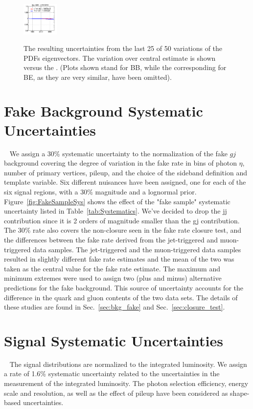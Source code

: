 \begin{figure}[!htbp]
{{\includegraphics[width=0.16\textwidth]{fig/spectra__pdf50_BB18_ADDGRW.png}\\}
\caption{The resulting uncertainties from the last 25 of 50 variations of the PDFs eigenvectors. 
The variation over central estimate is shown versus the \mgg. 
(Plots shown stand for BB, while the corresponding for BE, as they are very similar, have been omitted).
} 
\label{Fig:PDFs_Sys2} }
\end{figure}

\section{Fake Background Systematic Uncertainties}~\label{sec:fakeBKGSYS}
We assign a 30\% systematic uncertainty to the normalization of the fake $gj$ background covering the degree of variation in the fake rate in bins of photon $\eta$, number of primary vertices, pileup, and the choice of the sideband definition and template variable. Six different nuisances have been assigned, one for each of the six signal regions, with a 30\% magnitude and a lognormal prior. Figure~\ref{fig:FakeSampleSys} shows the effect of the "fake sample" systematic uncertainty listed in Table~\ref{tab:Systematics}. We've decided to drop the jj contribution since it is 2 orders of magnitude smaller than the gj contribution. The 30\% rate also covers the non-closure seen in the fake rate closure test, and the differences between the fake rate derived from the jet-triggered and muon-triggered data samples. The jet-triggered and the muon-triggered data samples resulted in slightly different fake rate estimates and the mean of the two was taken as the central value for the fake rate estimate. The maximum and minimum extremes were used to assign two (plus and minus) alternative predictions for the fake background. This source of uncertainty accounts for the difference in the quark and gluon contents of the two data sets. The details of these studies are found in Sec.~\ref{sec:bkg_fake} and Sec.~\ref{sec:closure_test}. 

\section{Signal Systematic Uncertainties}~\label{sec:sigSYS}
The signal distributions are normalized to the integrated luminosity. We assign a rate of 1.6\% systematic uncertainty related to the uncertainties in the measurement of the integrated luminosity. The photon selection efficiency, energy scale and resolution, as well as the effect of pileup have been considered as shape-based uncertainties. 



